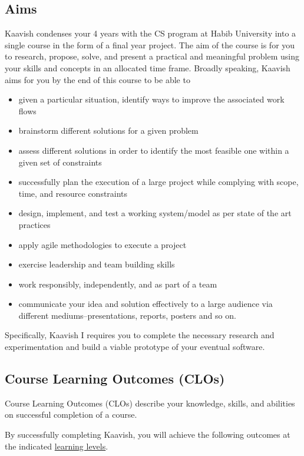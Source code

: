 \documentclass[a4paper]{article}
\newcommand{\new}[1]{{#1}}
\begin{document}
\subsection{Aims}
Kaavish condenses your 4 years with the CS program at Habib University into a single course in the form of a final year project. The aim of the course is for you to research, propose, solve, and present a practical and meaningful problem using your skills and concepts in an allocated time frame. Broadly speaking, Kaavish aims for you by the end of this course to be able to
\begin{itemize}
\item given a particular situation, identify ways to improve the associated work flows
\item brainstorm different solutions for a given problem
\item assess different solutions in order to identify the most feasible one within a given set of constraints
\item successfully plan the execution of a large project while complying with scope, time, and resource constraints
\item design, implement, and test a working system/model as per state of the art practices
\item apply agile methodologies to execute a project
\item exercise leadership and team building skills
\item work responsibly, independently, and as part of a team
\item communicate your idea and solution effectively to a large audience via different mediums--presentations, reports, posters and so on.
\end{itemize}

\new{Specifically, Kaavish I requires you to complete the necessary research and experimentation and build a viable prototype of your eventual software.}

\subsection{Course Learning Outcomes (CLOs)}

\new{Course Learning Outcomes (CLOs) describe your knowledge, skills, and abilities on successful completion of a course.}

\new{By successfully completing Kaavish, you will achieve the following outcomes at the indicated} \href{https://educerecentre.com/what-are-the-three-domains-of-blooms-taxonomy/}{learning levels}.
\end{document}
